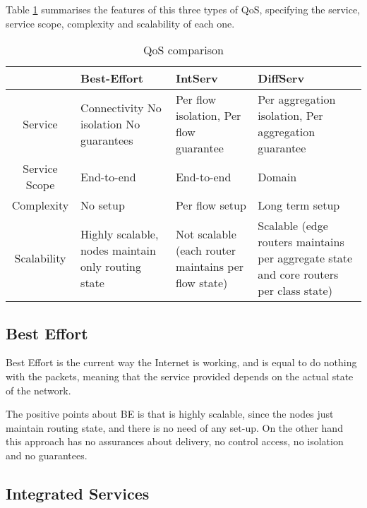 Table \ref{table:qosComp} summarises the features of this three types of QoS, specifying the service, service scope, complexity and scalability of each one.

\begin{table}[ht] 
\caption{QoS comparison} %
\centering %
\begin{tabular}{c || p{2.5cm} p{3.5cm} p{4.5cm}} %
\hline\hline %
  & Best-Effort & IntServ & DiffServ \\ [0.5ex] %
\hline %
Service & Connectivity No isolation  No guarantees & Per flow isolation, Per flow guarantee & Per aggregation isolation, Per aggregation guarantee \\   \hline %
Service Scope & End-to-end & End-to-end & Domain \\   \hline
Complexity & No setup & Per flow setup & Long term setup \\   \hline
Scalability & Highly scalable, nodes maintain only routing state & Not scalable (each router maintains per flow state) & Scalable (edge routers maintains per aggregate state and core routers per class state) \\ [1ex] %
\hline %
\end{tabular} 
\label{table:qosComp} %
\end{table}


\subsection{Best Effort}
\label{sec:be}

Best Effort is the current way the Internet is working, and is equal to do nothing with the packets, meaning that the service provided depends on the actual state of the network.

The positive points about BE is that is highly scalable, since the nodes just maintain routing state, and there is no need of any set-up. On the other hand this approach has no assurances about delivery, no control access, no isolation and no guarantees. 

\subsection{Integrated Services}
\label{sec:intserv}

